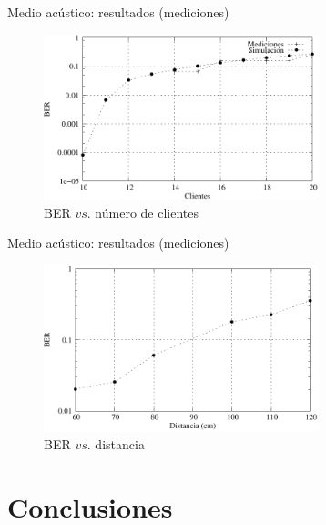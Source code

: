 \documentclass[aspectratio=169]{beamer}
\begin{document}
\begin{frame}{Medio acústico: resultados (mediciones)}
  
  \begin{figure}[t]
  \centering  
    \includegraphics[width=8cm]{graphs/medidas_clientes_JIS-fig6}
    \\ BER $vs.$ número de clientes
    \label{ios_process_mem}
\end{figure}

\end{frame}

\begin{frame}{Medio acústico: resultados (mediciones)}
  
\begin{figure}[t]
  \centering  
    \includegraphics[width=8cm]{graphs/mediciones-distancia-fig7}
    \\ BER $vs.$ distancia
    \label{ios_process_mem}
\end{figure}

\end{frame}



\section{Conclusiones}
\end{document}
